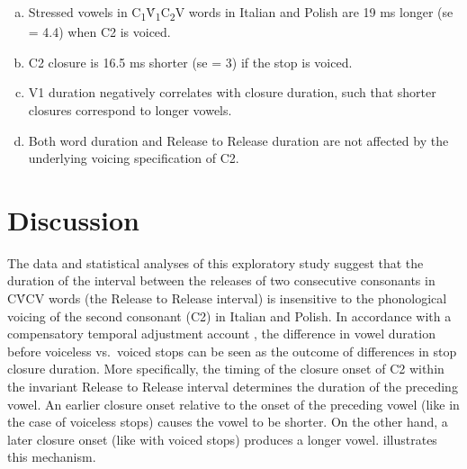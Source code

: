 \documentclass[preprint]{JASAnew}
\begin{document}
\begin{enumerate}[(a)]
  \item Stressed vowels in C\textsubscript{1}V́\textsubscript{1}C\textsubscript{2}V words in Italian and Polish are 19 ms longer (se = 4.4) when C2 is voiced.
  \item C2 closure is 16.5 ms shorter (se = 3) if the stop is voiced.
  \item V1 duration negatively correlates with closure duration, such that shorter closures correspond to longer vowels.
  \item Both word duration and Release to Release duration are not affected by the underlying voicing specification of C2.
\end{enumerate}

\section{Discussion}\label{discussion}

The data and statistical analyses of this exploratory study suggest that
the duration of the interval between the releases of two consecutive
consonants in CV́CV words (the Release to Release interval) is
insensitive to the phonological voicing of the second consonant (C2) in
Italian and Polish. In accordance with a compensatory temporal
adjustment account \citep{slis1969, lehiste1970}, the difference in
vowel duration before voiceless vs.~voiced stops can be seen as the
outcome of differences in stop closure duration. More specifically, the
timing of the closure onset of C2 within the invariant Release to
Release interval determines the duration of the preceding vowel. An
earlier closure onset relative to the onset of the preceding vowel (like
in the case of voiceless stops) causes the vowel to be shorter. On the
other hand, a later closure onset (like with voiced stops) produces a
longer vowel.  illustrates this mechanism.
\end{document}

